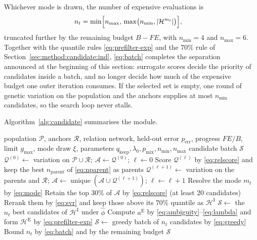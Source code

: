 \documentclass[11pt,a4paper]{article}
\begin{document}
Whichever mode is drawn, the number of expensive evaluations is
\begin{equation}
n_t=\min\Bigl[n_{\max},\,
\max\bigl(n_{\min},|\mathcal{H}^{m_t}|\bigr)\Bigr],
\label{eq:batch}
\end{equation}
truncated further by the remaining budget $B-FE$, with $n_{\min}=4$ and
$n_{\max}=6$. Together with the quantile rules
\eqref{eq:prefilter-exp} and the $70\%$ rule of
Section~\ref{sec:method:candidate:ind}, \eqref{eq:batch} completes the separation
announced at the beginning of this section: surrogate scores decide the priority
of candidates inside a batch, and no longer decide how much of the expensive
budget one outer iteration consumes. If the selected set is empty, one round of
genetic variation on the population and the anchors supplies at most $n_{\min}$
candidates, so the search loop never stalls.

Algorithm~\ref{alg:candidate} summarises the module.

\begin{algorithm}[t]
\caption{Dual-mode candidate selection}
\label{alg:candidate}
\begin{algorithmic}[1]
\Require population $\mathcal{P}$, anchors $\mathcal{R}$, relation network,
         held-out error $p_{\mathrm{err}}$, progress $FE/B$, limit $g_{\max}$,
         mode draw $\xi$, parameters
         $q_{\mathrm{keep}},\lambda_0,p_{\mathrm{mix}},n_{\min},n_{\max}$
\Ensure candidate batch $\mathcal{S}$
\State $\mathcal{Q}^{(0)}\gets$ variation on $\mathcal{P}\cup\mathcal{R}$;
       $\mathcal{A}\gets\mathcal{Q}^{(0)}$; $\ell\gets0$
  \State Score $\mathcal{Q}^{(\ell)}$ by \eqref{eq:relscore} and keep the best
         $n_{\mathrm{parent}}$ of \eqref{eq:nparent} as parents
  \State $\mathcal{Q}^{(\ell+1)}\gets$ variation on the parents and
         $\mathcal{R}$;
         $\mathcal{A}\gets\operatorname{unique}
         (\mathcal{A}\cup\mathcal{Q}^{(\ell+1)})$; $\ell\gets\ell+1$
\EndWhile
\State Resolve the mode $m_t$ by \eqref{eq:mode}
  \State Retain the top $30\%$ of $\mathcal{A}$ by \eqref{eq:relscore}
         (at least $20$ candidates)
  \State Rerank them by \eqref{eq:svr} and keep those above its $70\%$ quantile
         as $\mathcal{H}^{\mathrm{I}}$
  \State $\mathcal{S}\gets$ the $n_t$ best candidates of
         $\mathcal{H}^{\mathrm{I}}$ under $\widehat\phi$
\Else
  \State Compute $a^{\mathrm{E}}$ by \eqref{eq:ambiguity}--\eqref{eq:lambda} and
         form $\mathcal{H}^{\mathrm{E}}$ by \eqref{eq:prefilter-exp}
  \State $\mathcal{S}\gets$ greedy batch of $n_t$ candidates by
         \eqref{eq:greedy}
\EndIf
\State Bound $n_t$ by \eqref{eq:batch} and by the remaining budget
\State \Return $\mathcal{S}$
\end{algorithmic}
\end{algorithm}
\end{document}

